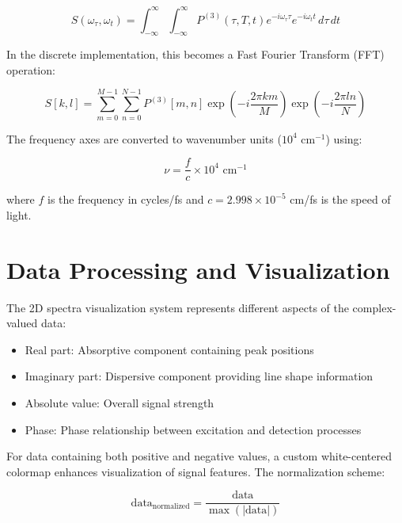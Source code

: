 \begin{equation}
	\label{eq:2d_fourier_transform}
	S(\omega_\tau, \omega_t) = \int_{-\infty}^{\infty} \int_{-\infty}^{\infty} P^{(3)}(\tau, T, t) e^{-i\omega_\tau \tau} e^{-i\omega_t t} \, d\tau \, dt
\end{equation}

\noindent
In the discrete implementation, this becomes a Fast Fourier Transform (FFT) operation:

\begin{equation}
	\label{eq:discrete_2d_fft}
	S[k,l] = \sum_{m=0}^{M-1} \sum_{n=0}^{N-1} P^{(3)}[m,n] \exp\left(-i\frac{2\pi km}{M}\right) \exp\left(-i\frac{2\pi ln}{N}\right)
\end{equation}

\noindent
The frequency axes are converted to wavenumber units ($10^4$ cm$^{-1}$) using:

\begin{equation}
	\label{eq:frequency_to_wavenumber}
	\nu = \frac{f}{c} \times 10^4 \text{ cm}^{-1}
\end{equation}

\noindent
where $f$ is the frequency in cycles/fs and $c = 2.998 \times 10^{-5}$ cm/fs is the speed of light.

\section{Data Processing and Visualization}
\label{sec:data_visualization}

\noindent
The 2D spectra visualization system represents different aspects of the complex-valued data:

\begin{itemize}
	\item Real part: Absorptive component containing peak positions
	\item Imaginary part: Dispersive component providing line shape information
	\item Absolute value: Overall signal strength
	\item Phase: Phase relationship between excitation and detection processes
\end{itemize}

\noindent
For data containing both positive and negative values, a custom white-centered colormap enhances visualization of signal features. The normalization scheme:

\begin{equation}
	\label{eq:data_normalization}
	\text{data}_{\text{normalized}} = \frac{\text{data}}{\max(|\text{data}|)}
\end{equation}

